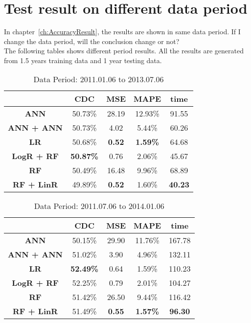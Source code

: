 \chapter{Test result on different data period}
\label{ch:futuerDiscuss}

In chapter~\ref{ch:AccuracyResult}, the results are shown in same data period. If I change the data period, will the conclusion change or not?\\

The following tables shows different period results. All the results are generated from 1.5 years training data and 1 year testing data.


\begin{table}[h]
	\centering
	\begin{tabular}{|c|c|c|c|c|}
		\hline
		& \textbf{CDC}     & \textbf{MSE}  & \textbf{MAPE}   & \textbf{time}  \\ \hline
		\textbf{ANN}       & 50.73\%          & 28.19         & 12.93\%         & 91.55          \\ \hline
		\textbf{ANN + ANN} & 50.73\%          & 4.02          & 5.44\%          & 60.26          \\ \hline
		\textbf{LR}        & 50.68\%          & \textbf{0.52} & \textbf{1.59\%} & 64.68          \\ \hline
		\textbf{LogR + RF} & \textbf{50.87\%} & 0.76          & 2.06\%          & 45.67          \\ \hline
		\textbf{RF}        & 50.49\%          & 16.48         & 9.96\%          & 68.89          \\ \hline
		\textbf{RF + LinR} & 49.89\%          & \textbf{0.52} & 1.60\%          & \textbf{40.23} \\ \hline
	\end{tabular}
	\caption{Data Period: 2011.01.06 to 2013.07.06}
	\label{tb:DataPeriod1}
\end{table}

\begin{table}[h]
	\centering
	\begin{tabular}{|c|c|c|c|c|}
		\hline
		& \textbf{CDC}     & \textbf{MSE}  & \textbf{MAPE}   & \textbf{time}  \\ \hline
		\textbf{ANN}       & 50.15\%          & 29.90         & 11.76\%         & 167.78         \\ \hline
		\textbf{ANN + ANN} & 51.02\%          & 3.90          & 4.96\%          & 132.11         \\ \hline
		\textbf{LR}        & \textbf{52.49\%} & 0.64          & 1.59\%          & 110.23         \\ \hline
		\textbf{LogR + RF} & 52.25\%          & 0.79          & 2.01\%          & 104.27         \\ \hline
		\textbf{RF}        & 51.42\%          & 26.50         & 9.44\%          & 116.42         \\ \hline
		\textbf{RF + LinR} & 51.49\%          & \textbf{0.55} & \textbf{1.57\%} & \textbf{96.30} \\ \hline
	\end{tabular}
	\caption{Data Period: 2011.07.06 to 2014.01.06}
	\label{tb:DataPeriod2}
\end{table}


